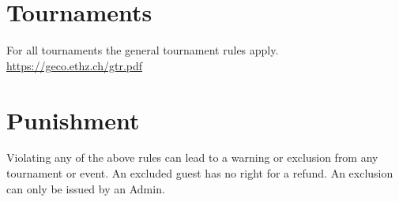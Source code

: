 \documentclass{article}
\begin{document}
\section{Tournaments}
For all tournaments the general tournament rules apply. \\ \url{https://geco.ethz.ch/gtr.pdf}


\section{Punishment}
Violating any of the above rules can lead to a warning or exclusion from any tournament or event.
An excluded guest has no right for a refund.
An exclusion can only be issued by an Admin.
\end{document}
